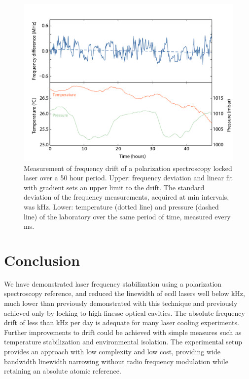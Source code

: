 \begin{figure}[htbp]
\centering
\includegraphics[width=\linewidth]{chapter1/Figs/fig6_v1.pdf}
\caption{Measurement of frequency drift of a polarization spectroscopy locked laser over a 50 hour period.
Upper: frequency deviation and linear fit with gradient  sets an upper limit to the drift.
The standard deviation of the frequency measurements, acquired at \unit[5]{min} intervals, was \unit[155]{kHz}.
Lower: temperature (dotted line) and pressure (dashed line) of the laboratory over the same period of time, measured every \unit[200]{ms}.}
\label{drift}
\end{figure}

\section{Conclusion}
We have demonstrated laser frequency stabilization using a polarization spectroscopy reference, and reduced the linewidth of \gls*{ecdl} lasers well below \unit[1]{kHz}, much lower than previously demonstrated with this technique and previously achieved only by locking to high-finesse optical cavities.
The absolute frequency drift of less than \unit[50]{kHz} per day is adequate for many laser cooling experiments.
Further improvements to drift could be achieved with simple measures such as temperature stabilization and environmental isolation.
The experimental setup provides an approach with low complexity and low cost, providing wide bandwidth linewidth narrowing without radio frequency modulation while retaining an absolute atomic reference.

